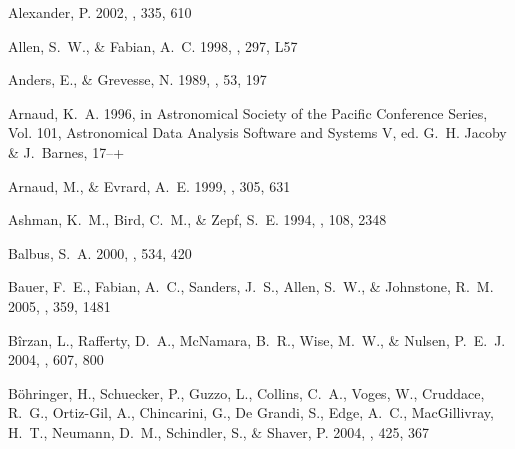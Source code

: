\documentclass[12pt,preprint]{aastex}
\begin{document}
\begin{thebibliography}{137}

{Alexander}, P. 2002, \mnras, 335, 610

{Allen}, S.~W., \& {Fabian}, A.~C. 1998, \mnras, 297, L57

{Anders}, E., \& {Grevesse}, N. 1989, \gca, 53, 197

{Arnaud}, K.~A. 1996, in Astronomical Society of the Pacific Conference Series,
  Vol. 101, Astronomical Data Analysis Software and Systems V, ed. G.~H.
  {Jacoby} \& J.~{Barnes}, 17--+

{Arnaud}, M., \& {Evrard}, A.~E. 1999, \mnras, 305, 631

{Ashman}, K.~M., {Bird}, C.~M., \& {Zepf}, S.~E. 1994, \aj, 108, 2348

{Balbus}, S.~A. 2000, \apj, 534, 420

{Bauer}, F.~E., {Fabian}, A.~C., {Sanders}, J.~S., {Allen}, S.~W., \&
  {Johnstone}, R.~M. 2005, \mnras, 359, 1481

{B{\^i}rzan}, L., {Rafferty}, D.~A., {McNamara}, B.~R., {Wise}, M.~W., \&
  {Nulsen}, P.~E.~J. 2004, \apj, 607, 800

{B{\"o}hringer}, H., {Schuecker}, P., {Guzzo}, L., {Collins}, C.~A., {Voges},
  W., {Cruddace}, R.~G., {Ortiz-Gil}, A., {Chincarini}, G., {De Grandi}, S.,
  {Edge}, A.~C., {MacGillivray}, H.~T., {Neumann}, D.~M., {Schindler}, S., \&
  {Shaver}, P. 2004, \aap, 425, 367


\end{thebibliography}
\end{document}
